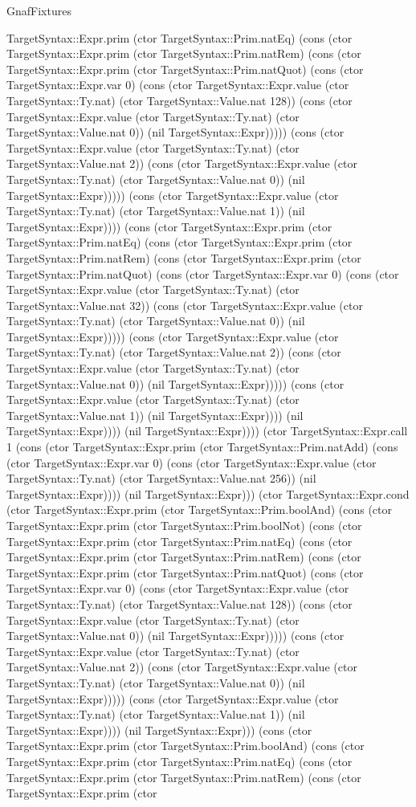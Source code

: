 \begin{lexlean}{GnafFixtures}
\begin{semanticmodule}
{TargetSyntax::Expr.prim (ctor TargetSyntax::Prim.natEq) (cons (ctor TargetSyntax::Expr.prim (ctor TargetSyntax::Prim.natRem) (cons (ctor TargetSyntax::Expr.prim (ctor TargetSyntax::Prim.natQuot) (cons (ctor TargetSyntax::Expr.var 0) (cons (ctor TargetSyntax::Expr.value (ctor TargetSyntax::Ty.nat) (ctor TargetSyntax::Value.nat 128)) (cons (ctor TargetSyntax::Expr.value (ctor TargetSyntax::Ty.nat) (ctor TargetSyntax::Value.nat 0)) (nil TargetSyntax::Expr))))) (cons (ctor TargetSyntax::Expr.value (ctor TargetSyntax::Ty.nat) (ctor TargetSyntax::Value.nat 2)) (cons (ctor TargetSyntax::Expr.value (ctor TargetSyntax::Ty.nat) (ctor TargetSyntax::Value.nat 0)) (nil TargetSyntax::Expr))))) (cons (ctor TargetSyntax::Expr.value (ctor TargetSyntax::Ty.nat) (ctor TargetSyntax::Value.nat 1)) (nil TargetSyntax::Expr)))) (cons (ctor TargetSyntax::Expr.prim (ctor TargetSyntax::Prim.natEq) (cons (ctor TargetSyntax::Expr.prim (ctor TargetSyntax::Prim.natRem) (cons (ctor TargetSyntax::Expr.prim (ctor TargetSyntax::Prim.natQuot) (cons (ctor TargetSyntax::Expr.var 0) (cons (ctor TargetSyntax::Expr.value (ctor TargetSyntax::Ty.nat) (ctor TargetSyntax::Value.nat 32)) (cons (ctor TargetSyntax::Expr.value (ctor TargetSyntax::Ty.nat) (ctor TargetSyntax::Value.nat 0)) (nil TargetSyntax::Expr))))) (cons (ctor TargetSyntax::Expr.value (ctor TargetSyntax::Ty.nat) (ctor TargetSyntax::Value.nat 2)) (cons (ctor TargetSyntax::Expr.value (ctor TargetSyntax::Ty.nat) (ctor TargetSyntax::Value.nat 0)) (nil TargetSyntax::Expr))))) (cons (ctor TargetSyntax::Expr.value (ctor TargetSyntax::Ty.nat) (ctor TargetSyntax::Value.nat 1)) (nil TargetSyntax::Expr)))) (nil TargetSyntax::Expr)))) (nil TargetSyntax::Expr)))) (ctor TargetSyntax::Expr.call 1 (cons (ctor TargetSyntax::Expr.prim (ctor TargetSyntax::Prim.natAdd) (cons (ctor TargetSyntax::Expr.var 0) (cons (ctor TargetSyntax::Expr.value (ctor TargetSyntax::Ty.nat) (ctor TargetSyntax::Value.nat 256)) (nil TargetSyntax::Expr)))) (nil TargetSyntax::Expr))) (ctor TargetSyntax::Expr.cond (ctor TargetSyntax::Expr.prim (ctor TargetSyntax::Prim.boolAnd) (cons (ctor TargetSyntax::Expr.prim (ctor TargetSyntax::Prim.boolNot) (cons (ctor TargetSyntax::Expr.prim (ctor TargetSyntax::Prim.natEq) (cons (ctor TargetSyntax::Expr.prim (ctor TargetSyntax::Prim.natRem) (cons (ctor TargetSyntax::Expr.prim (ctor TargetSyntax::Prim.natQuot) (cons (ctor TargetSyntax::Expr.var 0) (cons (ctor TargetSyntax::Expr.value (ctor TargetSyntax::Ty.nat) (ctor TargetSyntax::Value.nat 128)) (cons (ctor TargetSyntax::Expr.value (ctor TargetSyntax::Ty.nat) (ctor TargetSyntax::Value.nat 0)) (nil TargetSyntax::Expr))))) (cons (ctor TargetSyntax::Expr.value (ctor TargetSyntax::Ty.nat) (ctor TargetSyntax::Value.nat 2)) (cons (ctor TargetSyntax::Expr.value (ctor TargetSyntax::Ty.nat) (ctor TargetSyntax::Value.nat 0)) (nil TargetSyntax::Expr))))) (cons (ctor TargetSyntax::Expr.value (ctor TargetSyntax::Ty.nat) (ctor TargetSyntax::Value.nat 1)) (nil TargetSyntax::Expr)))) (nil TargetSyntax::Expr))) (cons (ctor TargetSyntax::Expr.prim (ctor TargetSyntax::Prim.boolAnd) (cons (ctor TargetSyntax::Expr.prim (ctor TargetSyntax::Prim.natEq) (cons (ctor TargetSyntax::Expr.prim (ctor TargetSyntax::Prim.natRem) (cons (ctor TargetSyntax::Expr.prim (ctor }
\end{semanticmodule}
\end{lexlean}
